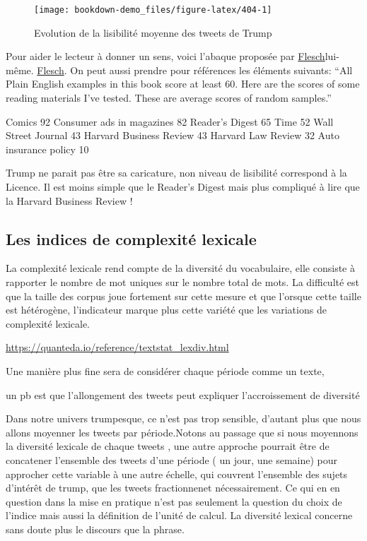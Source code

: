 \documentclass[
]{book}
\begin{document}
\begin{figure}

{\centering \texttt{[image: bookdown-demo\_files/figure-latex/404-1]} 

}

\caption{Evolution de la lisibilité moyenne des tweets de Trump}\label{fig:404}
\end{figure}

Pour aider le lecteur à donner un sens, voici l'abaque proposée par \href{http://www.appstate.edu/~steelekm/classes/psy2664/Flesch.htm}{Flesch}lui-même. \href{ReadabilityFlesch.JPG}{Flesch}. On peut aussi prendre pour références les éléments suivants: ``All Plain English examples in this book score at least 60. Here are the scores of some reading materials I've tested. These are average scores of random samples.''

Comics 92
Consumer ads in magazines 82
Reader's Digest 65
Time 52
Wall Street Journal 43
Harvard Business Review 43
Harvard Law Review 32
Auto insurance policy 10

Trump ne parait pas être sa caricature, non niveau de lisibilité correspond à la Licence. Il est moins simple que le Reader's Digest mais plus compliqué à lire que la Harvard Business Review !

\hypertarget{les-indices-de-complexituxe9-lexicale}{%
\subsection{Les indices de complexité lexicale}\label{les-indices-de-complexituxe9-lexicale}}

La complexité lexicale rend compte de la diversité du vocabulaire, elle consiste à rapporter le nombre de mot uniques sur le nombre total de mots. La difficulté est que la taille des corpus joue fortement sur cette mesure et que l'orsque cette taille est hétérogène, l'indicateur marque plus cette variété que les variations de complexité lexicale.\citep{tweedie_how_1998}

\url{https://quanteda.io/reference/textstat_lexdiv.html}

Une manière plus fine sera de considérer chaque période comme un texte,

un pb est que l'allongement des tweets peut expliquer l'accroissement de diversité

Dans notre univers trumpesque, ce n'est pas trop sensible, d'autant plus que nous allons moyenner les tweets par période.Notons au passage que si nous moyennons la diversité lexicale de chaque tweets , une autre approche pourrait être de concatener l'ensemble des tweets d'une période ( un jour, une semaine) pour approcher cette variable à une autre échelle, qui couvrent l'ensemble des sujets d'intérêt de trump, que les tweets fractionnenet nécessairement. Ce qui en en question dans la mise en pratique n'est pas seulement la question du choix de l'indice mais aussi la définition de l'unité de calcul. La diversité lexical concerne sans doute plus le discours que la phrase.
\end{document}
